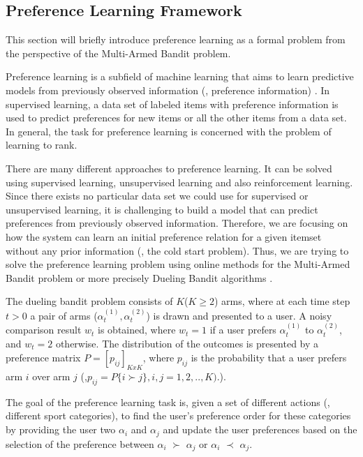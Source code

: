 \documentclass[twocolumn]{svjour3}          %
\begin{document}
\hypertarget{preference-learning-framework}{%
\subsection{\texorpdfstring{Preference Learning Framework
\label{sec:framework}}{Preference Learning Framework }}\label{preference-learning-framework}}

This section will briefly introduce preference learning as a formal
problem from the perspective of the Multi-Armed Bandit problem.

Preference learning is a subfield of machine learning that aims to learn
predictive models from previously observed information (\ie{},
preference information) \autocite{Fuernkranz2011}. In supervised
learning, a data set of labeled items with preference information is
used to predict preferences for new items or all the other items from a
data set. In general, the task for preference learning is concerned with
the problem of learning to rank.

There are many different approaches to preference learning. It can be
solved using supervised learning, unsupervised learning and also
reinforcement learning. Since there exists no particular data set we
could use for supervised or unsupervised learning, it is challenging to
build a model that can predict preferences from previously observed
information. Therefore, we are focusing on how the system can learn an
initial preference relation for a given itemset without any prior
information (\ie{}, the cold start problem). Thus, we are trying to
solve the preference learning problem using online methods for the
Multi-Armed Bandit problem or more precisely Dueling Bandit algorithms
\autocite{yue2012k}.

The dueling bandit problem consists of \(K\)(\(K\geq2\)) arms, where at
each time step \(t>0\) a pair of arms
(\(\alpha_{t}^{(1)},\alpha_{t}^{(2)}\)) is drawn and presented to a
user. A noisy comparison result \(w_{t}\) is obtained, where \(w_{t}=1\)
if a user prefers \(\alpha_{t}^{(1)}\) to \(\alpha_{t}^{(2)}\), and
\(w_{t}=2\) otherwise. The distribution of the outcomes is presented by
a preference matrix \(P=[p_{ij}]_{KxK}\), where \(p_{ij}\) is the
probability that a user prefers arm \(i\) over arm \(j\)
(\eg{},\(p_{ij} = P\{i\succ j\}, i,j = 1,2,..,K).\)).

The goal of the preference learning task is, given a set of different
actions (\eg{}, different sport categories), to find the user's
preference order for these categories by providing the user two
\(\alpha_{i}\) and \(\alpha_{j}\) and update the user preferences based
on the selection of the preference between \(\alpha_i\) \(\succ\)
\(\alpha_j\) or \(\alpha_i\) \(\prec\) \(\alpha_j\).
\end{document}
